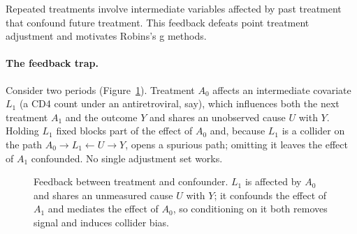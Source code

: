 Repeated treatments involve intermediate variables affected by past treatment that confound future treatment. This feedback defeats point treatment adjustment and motivates Robins's g methods.

\paragraph{The feedback trap.} Consider two periods (Figure~\ref{fw:fig:gmethods}). Treatment $A_0$ affects an intermediate covariate $L_1$ (a CD4 count under an antiretroviral, say), which influences both the next treatment $A_1$ and the outcome $Y$ and shares an unobserved cause $U$ with $Y$. Holding $L_1$ fixed blocks part of the effect of $A_0$ and, because $L_1$ is a collider on the path $A_0\to L_1\leftarrow U\to Y$, opens a spurious path; omitting it leaves the effect of $A_1$ confounded. No single adjustment set works.

\begin{figure}[htbp]
\centering
{}
\caption{Feedback between treatment and confounder. $L_1$ is affected by $A_0$ and shares an unmeasured cause $U$ with $Y$; it confounds the effect of $A_1$ and mediates the effect of $A_0$, so conditioning on it both removes signal and induces collider bias.}
\label{fw:fig:gmethods}
\end{figure}

